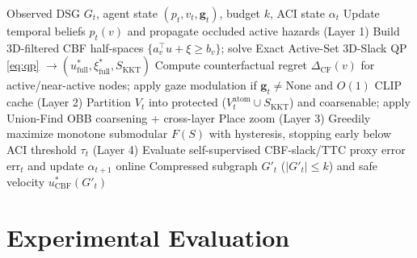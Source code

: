 \documentclass[journal]{IEEEtran}
\begin{document}
\begin{algorithm}[t]
\caption{Aegis-DSG v4.0 (CCBS + Online ACI) Per-Frame Step}
\label{alg:aegisv4}
\begin{algorithmic}[1]
\REQUIRE Observed DSG $G_t$, agent state $(p_t, v_t, \mathbf{g}_t)$, budget $k$, ACI state $\alpha_t$
\STATE Update temporal beliefs $p_t(v)$ and propagate occluded active hazards (Layer 1)
\STATE Build 3D-filtered CBF half-spaces $\{a_v^\top u + \xi \ge b_v\}$; solve Exact Active-Set 3D-Slack QP \eqref{eq:qp} $\to (u^*_{\text{full}}, \xi^*_{\text{full}}, S_{\text{KKT}})$
\STATE Compute counterfactual regret $\Delta_{\text{CF}}(v)$ for active/near-active nodes; apply gaze modulation if $\mathbf{g}_t \neq \text{None}$ and $O(1)$ CLIP cache (Layer 2)
\STATE Partition $V_t$ into protected ($V_t^{\text{atom}} \cup S_{\text{KKT}}$) and coarsenable; apply Union-Find OBB coarsening + cross-layer Place zoom (Layer 3)
\STATE Greedily maximize monotone submodular $F(S)$ with hysteresis, stopping early below ACI threshold $\tau_t$ (Layer 4)
\STATE Evaluate self-supervised CBF-slack/TTC proxy error $\text{err}_t$ and update $\alpha_{t+1}$ online
\RETURN Compressed subgraph $G'_t$ ($|G'_t| \le k$) and safe velocity $u^*_{\text{CBF}}(G'_t)$
\end{algorithmic}
\end{algorithm}

\section{Experimental Evaluation}
\end{document}
